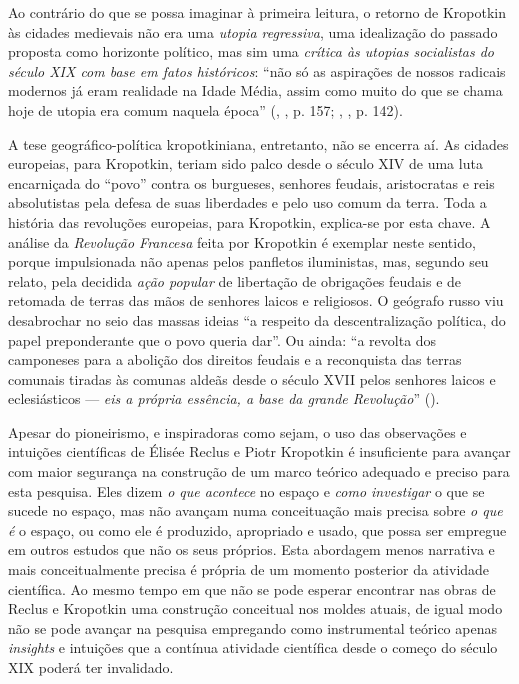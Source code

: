 Ao contrário do que se possa imaginar à primeira leitura, o retorno de Kropotkin às cidades medievais não era uma \textit{utopia regressiva}, uma idealização do passado proposta como horizonte político, mas sim uma \textit{crítica às utopias socialistas do século XIX com base em fatos históricos}: ``não só as aspirações de nossos radicais modernos já eram realidade na Idade Média, assim como muito do que se chama hoje de utopia era comum naquela época'' (\citeauthor{KROPOTKIN2009}, \citeyear{KROPOTKIN2009}, p. 157; \citeauthor{HORNER1989}, \citeyear{HORNER1989}, p. 142).

A tese geográfico-política kropotkiniana, entretanto, não se encerra aí. As cidades europeias, para Kropotkin, teriam sido palco desde o século XIV de uma luta encarniçada do ``povo'' contra os burgueses, senhores feudais, aristocratas e reis absolutistas pela defesa de suas liberdades e pelo uso comum da terra. Toda a história das revoluções europeias, para Kropotkin, explica-se por esta chave. A análise da  \textit{Revolução Francesa} feita por Kropotkin é exemplar neste sentido, porque impulsionada não apenas pelos panfletos iluministas, mas, segundo seu relato, pela decidida \textit{ação popular} de libertação de obrigações feudais e de retomada de terras das mãos de senhores laicos e religiosos. O geógrafo russo viu desabrochar no seio das massas ideias ``a respeito da descentralização política, do papel preponderante que o povo queria dar''. Ou ainda: ``a revolta dos camponeses para a abolição dos direitos feudais e a reconquista das terras comunais tiradas às comunas aldeãs desde o século XVII pelos senhores laicos e eclesiásticos --- \textit{eis a própria essência, a base da grande Revolução}'' (\cite[p.~114]{KROPOTKIN1955}). 

Apesar do pioneirismo, e inspiradoras como sejam, o uso das observações e intuições científicas de Élisée Reclus e Piotr Kropotkin é insuficiente para avançar com maior segurança na construção de um marco teórico adequado e preciso para esta pesquisa. Eles dizem \textit{o que acontece} no espaço e \textit{como investigar} o que se sucede no espaço, mas não avançam numa conceituação mais precisa sobre \textit{o que é} o espaço, ou como ele é produzido, apropriado e usado, que possa ser empregue em outros estudos que não os seus próprios. Esta abordagem menos narrativa e mais conceitualmente precisa é própria de um momento posterior da atividade científica. Ao mesmo tempo em que não se pode esperar encontrar nas obras de Reclus e Kropotkin uma construção conceitual nos moldes atuais, de igual modo não se pode avançar na pesquisa empregando como instrumental teórico apenas \textit{insights} e intuições que a contínua atividade científica desde o começo do século XIX poderá ter invalidado. 


